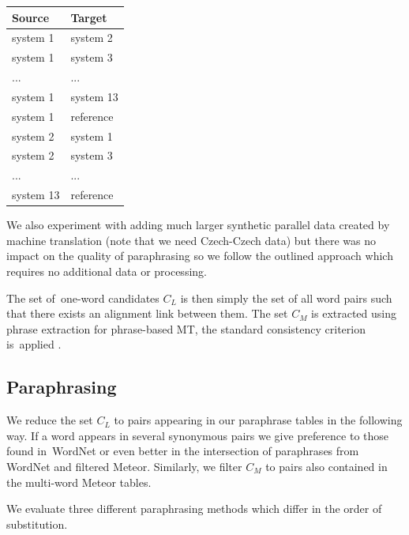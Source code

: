 \documentclass[11pt]{article}
\begin{document}
\begin{description}
\begin{center}
\begin{tabular}{ll}
Source & Target \\
\hline
system 1 & system 2 \\
system 1 & system 3 \\
... & ...\\
system 1 & system 13 \\
system 1 & reference \\
system 2 & system 1 \\
system 2 & system 3 \\
... & ... \\
system 13 & reference \\
\end{tabular}
\end{center}

We also experiment with adding much larger synthetic parallel data created by
machine translation (note that we need Czech-Czech data) but there was no impact
on the quality of paraphrasing so we follow the outlined approach which requires
no additional data or processing.

The set of~one-word candidates $C_L$ is then simply the set of all word pairs such
that there exists an alignment link between them. The set $C_M$ is extracted
using phrase extraction for phrase-based MT, the standard consistency criterion
is~applied \cite{Och99improvedalignment}.
\end{description}

\subsection{Paraphrasing}
We reduce the set $ C_{L} $ to pairs appearing in our paraphrase tables in the 
following way. If a word appears in several synonymous pairs we give preference 
to those found in~WordNet or even better in the intersection of paraphrases from 
WordNet and filtered Meteor. Similarly, we filter $ C_{M} $ to pairs also contained 
in the multi-word Meteor tables.

We evaluate three different paraphrasing methods which differ in the order of
substitution.
\end{document}

